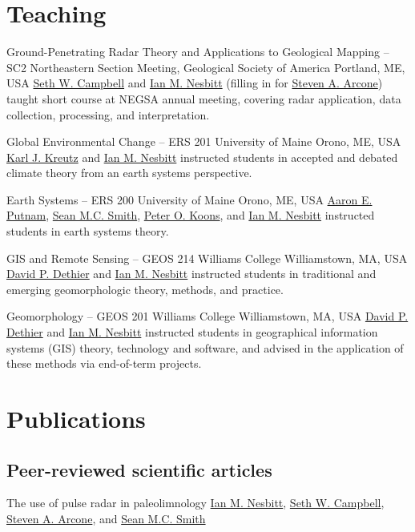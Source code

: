 \documentclass[a4paper,12pt,sans,colorlinks]{moderncv}
\newcommand{\me}{\href{https://www.iannesbitt.org}{Ian M. Nesbitt}}
\newcommand{\seth}{\href{https://www.alpinesciences.net}{Seth W. Campbell}}
\newcommand{\sean}{\href{https://umaine.edu/earthclimate/people/sean-m-c-smith/}{Sean M.C. Smith}}
\newcommand{\stevearcone}{\href{https://engineering.dartmouth.edu/community/faculty/steven-arcone}{Steven A. Arcone}}
\newcommand{\peter}{\href{https://umaine.edu/earthclimate/people/peter-koons/}{Peter O. Koons}}
\newcommand{\aaron}{\href{https://umaine.edu/earthclimate/people/aaron-putnam/}{Aaron E. Putnam}}
\newcommand{\karl}{\href{https://umaine.edu/earthclimate/people/karl-kreutz/}{Karl J. Kreutz}}
\newcommand{\david}{\href{https://geosciences.williams.edu/profile/ddethier/}{David P. Dethier}}
\begin{document}
\section{Teaching}


{Ground-Penetrating Radar Theory and Applications to Geological
Mapping -- SC2}
{Northeastern Section Meeting, Geological Society of America}
{Portland, ME, USA}
{}
{
    \seth{} and \me{} (filling in for \stevearcone{}) taught
    short course at NEGSA annual meeting, covering radar application,
    data collection, processing, and interpretation.
}

{Global Environmental Change -- ERS 201}
{University of Maine}
{Orono, ME, USA}
{}
{
    \karl{} and \me{} instructed students in accepted and
    debated climate theory from an earth systems perspective.
}

{Earth Systems -- ERS 200}
{University of Maine}
{Orono, ME, USA}
{}
{
    \aaron{}, \sean{}, \peter{}, and \me{} instructed students
    in earth systems theory.
}

{GIS and Remote Sensing -- GEOS 214}
{Williams College}
{Williamstown, MA, USA}
{}
{
    \david{} and \me{} instructed students in traditional and
    emerging geomorphologic theory, methods, and practice.
}

{Geomorphology -- GEOS 201}
{Williams College}
{Williamstown, MA, USA}
{}
{
    \david{} and \me{}
    instructed students in geographical information systems (GIS)
    theory, technology and software, and advised in the
    application of these methods via end-of-term projects.
}




\section{Publications}

\subsection{Peer-reviewed scientific articles}

{The use of pulse radar in paleolimnology}
{}
{}
{}
{
    \me{}, \seth{}, \stevearcone{}, and \sean{}
}
\end{document}
